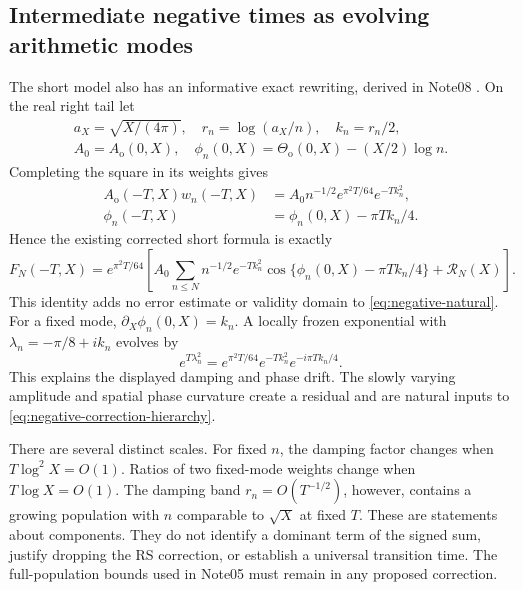 \documentclass[11pt]{article}
\numberwithin{equation}{section}
\begin{document}
\subsection{Intermediate negative times as evolving arithmetic modes}
The short model also has an informative exact rewriting, derived in
Note08 \cite{ansatz08}. On the real right tail let
\[
 \begin{gathered}
 a_X=\sqrt{X/(4\pi)},\quad r_n=\log(a_X/n),\quad k_n=r_n/2,\\
 A_0=A_{\mathrm o}(0,X),\quad
 \phi_n(0,X)=\Theta_{\mathrm o}(0,X)-(X/2)\log n.
 \end{gathered}
\]
Completing the square in its weights gives
\begin{align}
 A_{\mathrm o}(-T,X)w_n(-T,X)
 &=A_0n^{-1/2}e^{\pi^2T/64}e^{-Tk_n^2},\\
 \phi_n(-T,X)&=\phi_n(0,X)-\pi T k_n/4.
 \label{eq:negative-mode-weights}
\end{align}
Hence the existing corrected short formula is exactly
\begin{equation}
 F_N(-T,X)=e^{\pi^2T/64}\left[
 A_0\sum_{n\le N}n^{-1/2}e^{-Tk_n^2}
 \cos\{\phi_n(0,X)-\pi T k_n/4\}
 +\mathcal R_N(X)\right].
 \label{eq:negative-mode-sum}
\end{equation}
This identity adds no error estimate or validity domain to
\eqref{eq:negative-natural}. For a fixed mode,
\(\partial_X\phi_n(0,X)=k_n\). A locally frozen exponential with
\(\lambda_n=-\pi/8+ik_n\) evolves by
\[
 e^{T\lambda_n^2}
 =e^{\pi^2T/64}e^{-Tk_n^2}e^{-i\pi T k_n/4}.
\]
This explains the displayed damping and phase drift. The slowly
varying amplitude and spatial phase curvature create a residual and
are natural inputs to \eqref{eq:negative-correction-hierarchy}.

There are several distinct scales. For fixed \(n\), the damping
factor changes when \(T\log^2X=O(1)\). Ratios of two fixed-mode
weights change when \(T\log X=O(1)\). The damping band
\(r_n=O(T^{-1/2})\), however, contains a growing population with
\(n\) comparable to \(\sqrt X\) at fixed \(T\).
These are statements about components. They do not identify a dominant
term of the signed sum, justify dropping the RS correction, or establish
a universal transition time. The full-population bounds used in
Note05 must remain in any proposed correction.
\end{document}
